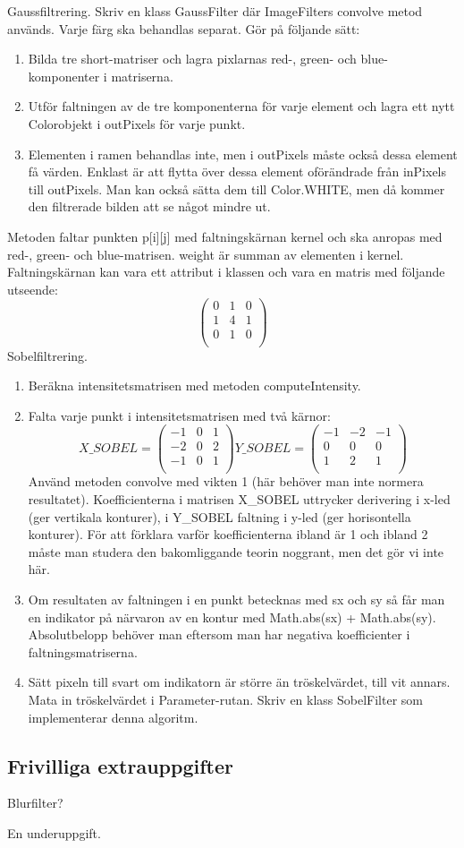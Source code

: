 \Task Gaussfiltrering. Skriv en klass GaussFilter där ImageFilters convolve metod används. Varje färg ska behandlas separat. Gör på följande sätt:
\begin{enumerate}
	\item Bilda tre short-matriser och lagra pixlarnas red-, green- och blue-komponenter i matriserna.
	\item Utför faltningen av de tre komponenterna för varje element och lagra ett nytt Colorobjekt i outPixels för varje punkt.
	\item Elementen i ramen behandlas inte, men i outPixels måste också dessa element få värden. Enklast är att flytta över dessa element oförändrade från inPixels till outPixels. Man kan också sätta dem till Color.WHITE, men då kommer den filtrerade bilden att se något mindre ut.
\end{enumerate}

Metoden faltar punkten p[i][j] med faltningskärnan kernel och ska anropas med red-, green- och blue-matrisen. weight är summan av elementen i kernel. Faltningskärnan kan vara ett attribut i klassen och vara en matris med följande utseende:
$$
\begin{pmatrix}
  0 & 1 & 0 \\
  1 & 4 & 1 \\
  0 & 1 & 0 \\
\end{pmatrix}
$$
\Task Sobelfiltrering.
\begin{enumerate} 
	\item Beräkna intensitetsmatrisen med metoden computeIntensity.
	\item Falta varje punkt i intensitetsmatrisen med två kärnor:
$$
X\_SOBEL =
\begin{pmatrix}
  -1 & 0 & 1 \\
  -2 & 0 & 2 \\
  -1 & 0 & 1 \\
\end{pmatrix}
Y\_SOBEL =
\begin{pmatrix}
  -1 & -2 & -1 \\
  0 & 0 & 0 \\
  1 & 2 & 1 \\
\end{pmatrix}
$$
	Använd metoden convolve med vikten 1 (här behöver man inte normera resultatet). Koefficienterna i matrisen X\_SOBEL uttrycker derivering i x-led (ger vertikala konturer), i Y\_SOBEL faltning i y-led (ger horisontella konturer). För att förklara varför koefficienterna ibland är 1 och ibland 2 måste man studera den bakomliggande teorin noggrant, men det gör vi inte här.
	\item Om resultaten av faltningen i en punkt betecknas med sx och sy så får man en indikator på närvaron av en kontur med Math.abs(sx) + Math.abs(sy). Absolutbelopp behöver man eftersom man har negativa koefficienter i faltningsmatriserna. 
	\item  Sätt pixeln till svart om indikatorn är större än tröskelvärdet, till vit annars. Mata in tröskelvärdet i Parameter-rutan. Skriv en klass SobelFilter som implementerar denna algoritm.
\end{enumerate}

\subsection{Frivilliga extrauppgifter}

\Task Blurfilter?

\Subtask En underuppgift.
